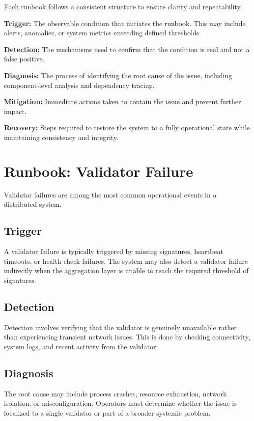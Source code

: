 Each runbook follows a consistent structure to ensure clarity and repeatability.

\textbf{Trigger:} The observable condition that initiates the runbook. This may include alerts, anomalies, or system metrics exceeding defined thresholds.

\textbf{Detection:} The mechanisms used to confirm that the condition is real and not a false positive.

\textbf{Diagnosis:} The process of identifying the root cause of the issue, including component-level analysis and dependency tracing.

\textbf{Mitigation:} Immediate actions taken to contain the issue and prevent further impact.

\textbf{Recovery:} Steps required to restore the system to a fully operational state while maintaining consistency and integrity.

\section{Runbook: Validator Failure}

Validator failures are among the most common operational events in a distributed system.

\subsection{Trigger}

A validator failure is typically triggered by missing signatures, heartbeat timeouts, or health check failures. The system may also detect a validator failure indirectly when the aggregation layer is unable to reach the required threshold of signatures.

\subsection{Detection}

Detection involves verifying that the validator is genuinely unavailable rather than experiencing transient network issues. This is done by checking connectivity, system logs, and recent activity from the validator.

\subsection{Diagnosis}

The root cause may include process crashes, resource exhaustion, network isolation, or misconfiguration. Operators must determine whether the issue is localized to a single validator or part of a broader systemic problem.

